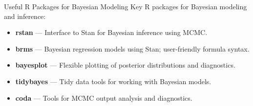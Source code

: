 \documentclass{beamer}
\begin{document}
\begin{frame}{Useful R Packages for Bayesian Modeling}
  Key R packages for Bayesian modeling and inference:
    \begin{itemize}
      \item \textbf{rstan} — Interface to Stan for Bayesian inference using MCMC.
      \item \textbf{brms} — Bayesian regression models using Stan; user-friendly formula syntax.
      \item \textbf{bayesplot} — Flexible plotting of posterior distributions and diagnostics.
      \item \textbf{tidybayes} — Tidy data tools for working with Bayesian models.
      \item \textbf{coda} — Tools for MCMC output analysis and diagnostics.
    \end{itemize}
\end{frame}
\end{document}

